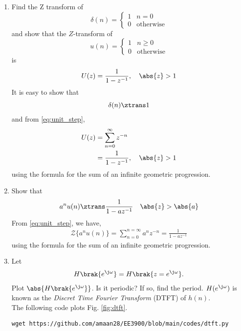 \documentclass[journal,12pt,twocolumn]{IEEEtran}
\renewcommand\thesection{\arabic{section}}
\begin{document}
\begin{enumerate}[label=\thesection.\arabic*]
%
\item Find the Z transform of 
\begin{equation}
\delta(n)
=
\begin{cases}
1 & n = 0
\\
0 & \text{otherwise}
\end{cases}
\end{equation}
and show that the $Z$-transform of
\begin{equation}
\label{eq:unit_step}
u(n)
=
\begin{cases}
1 & n \ge 0
\\
0 & \text{otherwise}
\end{cases}
\end{equation}
is
\begin{equation}
U(z) = \frac{1}{1-z^{-1}}, \quad \abs{z} > 1
\end{equation}
\solution It is easy to show that
\begin{equation}
\delta(n) \ztrans 1
\end{equation}
and from \eqref{eq:unit_step},
\begin{align}
U(z) &= \sum _{n= 0}^{\infty}z^{-n}
\\
&=\frac{1}{1-z^{-1}}, \quad \abs{z} > 1
\end{align}
using the formula for the sum of an infinite geometric progression.\\
%
\item Show that 
\begin{equation}
\label{eq:anun}
a^nu(n) \ztrans \frac{1}{1-az^{-1}} \quad \abs{z} > \abs{a}
\end{equation}
\solution From \eqref{eq:unit_step}, we have,
\begin{align}
   {\mathcal {Z}}\{a^{n}u(n)\}=\sum_{n=0}^{n=\infty}a^{n}z^{-n}
   =\frac{1}{1-az^{-1}}
\end{align}
using the formula for the sum of an infinite geometric progression.\\
%
\item 
Let
\begin{equation}
H\brak{e^{\j \omega}} = H\brak{z = e^{\j \omega}}.
\end{equation}
Plot $\abs{H\brak{e^{\j \omega}}}$.  Is it periodic? If so, find the period. $H(e^{\j \omega})$ is
known as the {\em Discret Time Fourier Transform} (DTFT) of $h(n)$.
\\
\solution The following code plots Fig. \ref{fig:dtft}.
\begin{lstlisting}
wget https://github.com/amaan28/EE3900/blob/main/codes/dtft.py

\end{lstlisting}
\end{enumerate}
\end{document}
